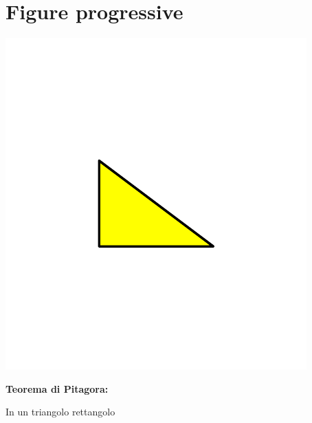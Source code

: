 \documentclass[italian,landscape]{report}
\begin{document}
\section{Figure progressive}

\begin{center}
\includegraphics[scale=1.2]{pitagora1}
\end{center}

\begin{firstheadlineitemize}

\item \textbf{Teorema di Pitagora:}

\pause

\begin{secondheadlineitemize}

\item In un triangolo rettangolo

\end{secondheadlineitemize}

\end{firstheadlineitemize}

\newframe
\end{document}
